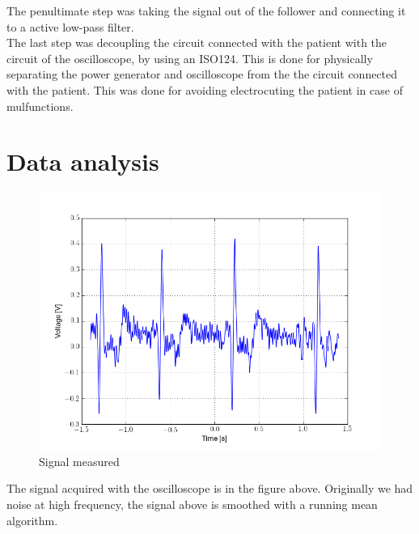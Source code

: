 The penultimate step was taking the signal out of the follower and connecting it to a active low-pass filter.\\

The last step was decoupling the circuit connected with the patient with the circuit of the oscilloscope, by using an ISO124. This is done for physically separating the power generator and oscilloscope from the the circuit connected with the patient. This was done for avoiding electrocuting the patient in case of mulfunctions.\\

\section{Data analysis}
\begin{figure}[H]
\centering
\includegraphics[width=.7\textwidth]{8/ecg.png}
\caption{Signal measured}
\end{figure}
The signal acquired with the oscilloscope is in the figure above. Originally we had noise at high frequency, the signal above is smoothed with a running mean algorithm.
